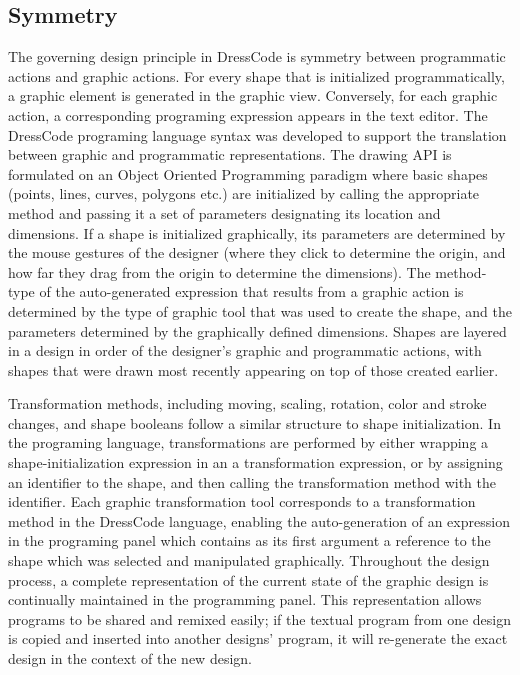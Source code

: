 \documentclass{sigchi}
\begin{document}
\subsection{Symmetry}
\label{subsec:symmetry}
The governing design principle in DressCode is symmetry between programmatic actions and graphic actions. For every shape that is initialized programmatically, a graphic element is generated in the graphic view. Conversely, for each graphic action, a corresponding programing expression appears in the text editor. The DressCode programing language syntax was developed to support the translation between graphic and programmatic representations. The drawing API is formulated on an Object Oriented Programming paradigm where basic shapes (points, lines, curves, polygons etc.) are initialized by calling the appropriate method and passing it a set of parameters designating its location and dimensions. If a shape is initialized graphically, its parameters are determined by the mouse gestures of the designer (where they click to determine the origin, and how far they drag from the origin to determine the dimensions). The method-type of the auto-generated expression that results from a graphic action is determined by the type of graphic tool that was used to create the shape, and the parameters determined by the graphically defined dimensions. Shapes are layered in a design in order of the designer's graphic and programmatic actions, with shapes that were drawn most recently appearing on top of those created earlier. %

Transformation methods, including moving, scaling, rotation, color and stroke changes, and shape booleans follow a similar structure to shape initialization. In the programing language, transformations are performed by either wrapping a shape-initialization expression in an a transformation expression, or by assigning an identifier to the shape, and then calling the transformation method with the identifier. Each graphic transformation tool corresponds to a transformation method in the DressCode language, enabling the auto-generation of an expression in the programing panel which contains as its first argument a reference to the shape which was selected and manipulated graphically. Throughout the design process, a complete representation of the current state of the graphic design is continually maintained in the programming panel. This representation allows programs to be shared and remixed easily; if the textual program from one design is copied and inserted into another designs' program, it will re-generate the exact design in the context of the new design. 
\end{document}

